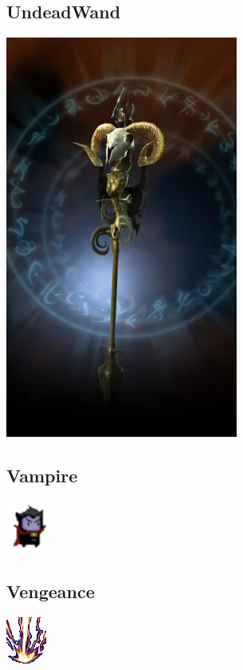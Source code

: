 \documentclass[a4paper,12pt]{scrartcl}
\begin{document}
	\subsection{UndeadWand}
	\begin{center}\includegraphics{Prog2_EA_V2/Art/UndeadWand.png}\end{center}
	\subsection{Vampire}
	\begin{center}\includegraphics{Prog2_EA_V2/Art/Vampire.png}\end{center}
	\subsection{Vengeance}
	\begin{center}\includegraphics{Prog2_EA_V2/Art/Vengeance.png}\end{center}
\end{document}
